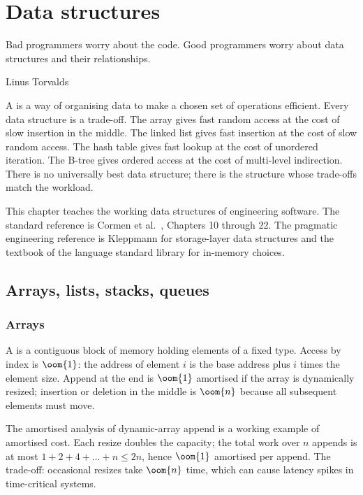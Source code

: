 \chapter{Data structures}
\label{vol07:ch04}

\epigraph{Bad programmers worry about the code. Good programmers worry about data structures and their relationships.}{Linus Torvalds}


\noindent
A  is a way of organising data to make a chosen set of operations efficient. Every data structure is a trade-off. The array gives fast random access at the cost of slow insertion in the middle. The linked list gives fast insertion at the cost of slow random access. The hash table gives fast lookup at the cost of unordered iteration. The B-tree gives ordered access at the cost of multi-level indirection. There is no universally best data structure; there is the structure whose trade-offs match the workload.

This chapter teaches the working data structures of engineering software. The standard reference is Cormen et al.\ \cite{text:cormen-clrs}, Chapters 10 through 22. The pragmatic engineering reference is Kleppmann \cite{text:kleppmann-ddia} for storage-layer data structures and the textbook of the language standard library for in-memory choices.

\section{Arrays, lists, stacks, queues}

\subsection{Arrays}

A  is a contiguous block of memory holding elements of a fixed type. Access by index is $\oom{1}$: the address of element $i$ is the base address plus $i$ times the element size. Append at the end is $\oom{1}$ amortised if the array is dynamically resized; insertion or deletion in the middle is $\oom{n}$ because all subsequent elements must move.

The amortised analysis of dynamic-array append is a working example of amortised cost. Each resize doubles the capacity; the total work over $n$ appends is at most $1 + 2 + 4 + \ldots + n \leq 2n$, hence $\oom{1}$ amortised per append. The trade-off: occasional resizes take $\oom{n}$ time, which can cause latency spikes in time-critical systems.

